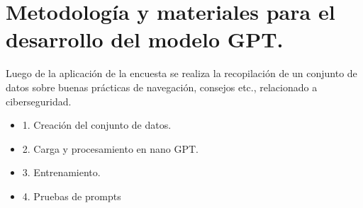 \section{Metodología y materiales para el desarrollo del modelo GPT.}\label{section:Metodología y materiales para el desarrollo del modelo GPT} 
Luego de la aplicación de la encuesta se realiza la recopilación de un conjunto de datos sobre buenas prácticas de navegación, consejos etc., relacionado a ciberseguridad. 
 \begin{itemize}
        \item 1.    Creación del conjunto de datos.
        \item 2.	Carga y procesamiento en nano GPT.
        \item 3.	Entrenamiento. 
        \item 4.	Pruebas de prompts
    \end{itemize}

